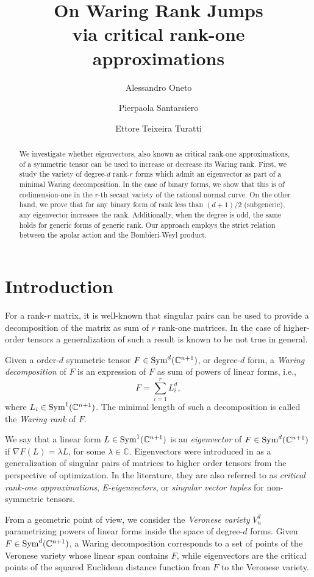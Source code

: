 \documentclass{amsart}
\title[On Waring Rank Jumps via critical rank-one approximations]{On Waring Rank Jumps \\ via critical rank-one approximations}
\author{Alessandro Oneto \and Pierpaola Santarsiero \and Ettore Teixeira Turatti}
\numberwithin{theorem}{section}
\theoremstyle{definition}
\newcommand{\CC}{\mathbb{C}}
\newcommand{\sym}{\mathop{\rm Sym}\nolimits}
\begin{document}
\maketitle
\begin{abstract}
    We investigate whether eigenvectors, also known as critical rank-one approximations, of a symmetric tensor can be used to increase or decrease its Waring rank. First, we study the variety of degree-$d$ rank-$r$ forms which admit an eigenvector as part of a minimal Waring decomposition. In the case of binary forms, we show that this is of codimension-one in the $r$-th secant variety of the rational normal curve. On the other hand, we prove that {for any binary form of rank less than $(d+1)/2$ (subgeneric), any eigenvector increases the rank. Additionally, when the degree is odd, the same holds for generic forms of generic rank.} Our approach employs the strict relation between the apolar action and the Bombieri-Weyl product. 
 
\end{abstract}


\section{Introduction}
For a rank-$r$ matrix, it is well-known that singular pairs can be used to provide a decomposition of the matrix as sum of $r$ rank-one matrices. In the case of higher-order tensors a generalization of such a result is known to be not true in general.

Given a order-$d$ symmetric tensor $F \in \sym^d(\CC^{n+1})$, or degree-$d$ form, a \emph{Waring decomposition} of $F$ is an expression of $F$ as sum of powers of linear forms, i.e., 
\[
    F=\sum_{i=1}^r L_i^d,
\]
where $L_i\in \sym^1(\CC^{n+1})$. The minimal length of such a decomposition is called the \emph{Waring rank} of $F$. 

We say that a linear form $L\in\sym^1(\CC^{n+1})$ is an \emph{eigenvector} of $F\in\sym^d(\CC^{n+1})$ if $\nabla F(L)=\lambda L$, for some $\lambda\in \CC$.  Eigenvectors were introduced in \cite{Lim05,Qi07} as a generalization of singular pairs of matrices to higher order tensors from the perspective of optimization. In the literature, they are also referred to as \emph{critical rank-one approximations}, \emph{E-eigenvectors}, or \emph{singular vector tuples} for non-symmetric tensors.

From a geometric point of view, we consider the \emph{Veronese variety} $V_n^d$ parametrizing powers of linear forms inside the space of degree-$d$ forms. Given $F\in\sym^d(\CC^{n+1})$, a Waring decomposition corresponds to a set of points of the Veronese variety whose linear span contains $F$, while eigenvectors are the critical points of the squared Euclidean distance function from $F$ to the Veronese variety. 
\end{document}
